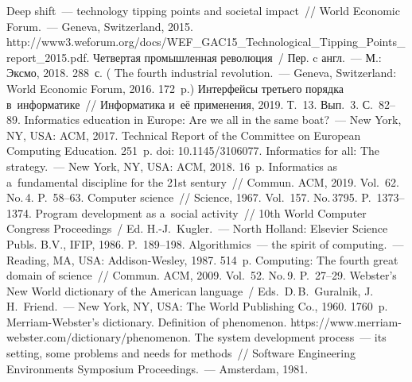 \begin{multicols}{2}
 {\small\frenchspacing
 {%
 \begin{thebibliography}{99}
Deep shift~--- technology tipping points and societal impact~// World 
Economic Forum.~--- Geneva, Switzerland, 2015. {\sf 
http://www3.weforum.org/docs/WEF\_\linebreak GAC15\_Technological\_Tipping\_Points\_report\_2015.pdf}.
 Четвертая промышленная революция~/ Пер. c англ.~--- М.: Эксмо, 2018. 
288~с. ( The fourth industrial revolution.~--- Geneva, Switzerland: World 
Economic Forum, 2016. 172~p.)
 Интерфейсы третьего порядка в~информатике~// Информатика и~её 
применения, 2019. Т.~13. Вып.~3. С.~82--89.
Informatics education in Europe: Are we all in the same boat?~--- New York, NY, USA: ACM, 2017. 
Technical Report of the 
Committee on European Computing Education. 251~p. 
doi: 10.1145/3106077.
 Informatics for all: The 
strategy.~--- New York, NY, USA: ACM, 2018. 16~p.
 Informatics as a~fundamental 
discipline for the 21st sentury~// Commun. ACM, 2019. Vol.~62. No.\,4.  
P.~58--63.
 Computer science~// Science, 1967. Vol.~157. No.\,3795. 
P.~1373--1374.
 Program development as a~social activity~// 10th World Computer Congress Proceedings~/ Ed. \mbox{H.-J.}~Kugler.~--- 
North Holland: Elsevier Science Publs. B.V., IFIP, 1986. 
P.~189--198.
 Algorithmics~--- the spirit of computing.~--- Reading, MA, USA:  
Addison-Wesley, 1987. 514~p.
 Computing: The fourth great domain of science~// Commun. 
ACM, 2009. Vol.~52. No.\,9. P.~27--29.
Webster's New World dictionary of the American language~/
Eds.\  D.\,B.~Guralnik, J.\,H.~Friend.~--- New York, NY, USA: The World Publishing 
Co., 1960. 1760~p.
Merriam-Webster's dictionary. Definition of phenomenon. {\sf  
https://www.merriam-webster.com/\linebreak dictionary/phenomenon}.
 The system development process~--- its setting, 
some problems and needs for methods~// Software Engineering Environments  Symposium Proceedings.~--- Amsterdam, 1981.  

\end{thebibliography}}}
\end{multicols}
